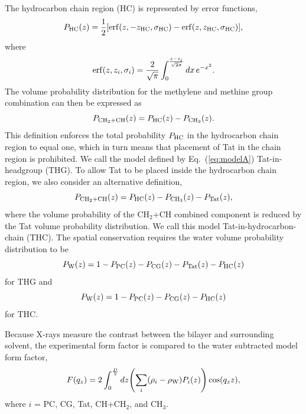 The hydrocarbon chain region (\acs{HC}) is represented by error functions,
\begin{equation}
  P_\textrm{HC}(z) = \frac{1}{2}\mathopen{}\left[ 
    \mathrm{erf}(z,-z_\textrm{HC},\sigma_\textrm{HC}) - \mathrm{erf}(z,z_\textrm{HC},\sigma_\textrm{HC})
   \right]\mathclose{},
\end{equation}
where
\begin{equation}
  \mathrm{erf}(z,z_i,\sigma_i)=\frac{2}{\sqrt{\pi}}
    \int_0^{\frac{z-z_i}{\sqrt{2\sigma}}} \mathop{dx} e^{-x^2}.
\end{equation}
The volume probability distribution for the methylene and methine group
combination can then be expressed as
\begin{equation}
  P_{\textrm{CH}_2+\textrm{CH}}(z) = P_\textrm{HC}(z)-P_{\textrm{CH}_3}(z).
  \label{eq:modelA}
\end{equation}
This definition enforces the total probability $P_\textrm{HC}$ in the hydrocarbon
chain region to equal one, which in turn means that placement of Tat in the  
chain region is prohibited. We call the model defined by Eq.~(\ref{eq:modelA})
Tat-in-headgroup (\acs{THG}). To allow Tat to be placed inside the hydrocarbon
chain region, we also consider an alternative definition,
\begin{equation}
  P_{\textrm{CH}_2+\textrm{CH}}(z) = P_\textrm{HC}(z)-P_{\textrm{CH}_3}(z) - P_\textrm{Tat}(z),
\end{equation}
where the volume probability of the CH$_2$+CH combined component is reduced by 
the Tat volume probability distribution. We call this model Tat-in-hydrocarbon-chain (\acs{THC}).
The spatial conservation requires the water volume probability distribution 
to be
\begin{equation}
  P_\textrm{W}(z) = 1-P_\textrm{PC}(z)-P_\textrm{CG}(z)-P_\textrm{Tat}(z)-P_\textrm{HC}(z)
\end{equation}
for THG and
\begin{equation}
  P_\textrm{W}(z) = 1-P_\textrm{PC}(z)-P_\textrm{CG}(z)-P_\textrm{HC}(z)
\end{equation}
for THC. 

Because X-rays measure the contrast between the bilayer and surrounding solvent, 
the experimental form factor is compared to the water subtracted model
form factor,
\begin{equation}
  F(q_z) = 2\int_0^{\frac{D}{2}} \mathop{dz} \mathopen{}\left( 
    \sum_i(\rho_i-\rho_\textrm{W})P_i(z)
   \right)\mathclose{} \cos(q_zz),
\end{equation}
where $i$ = PC, CG, Tat, CH+CH$_2$, and CH$_3$.


